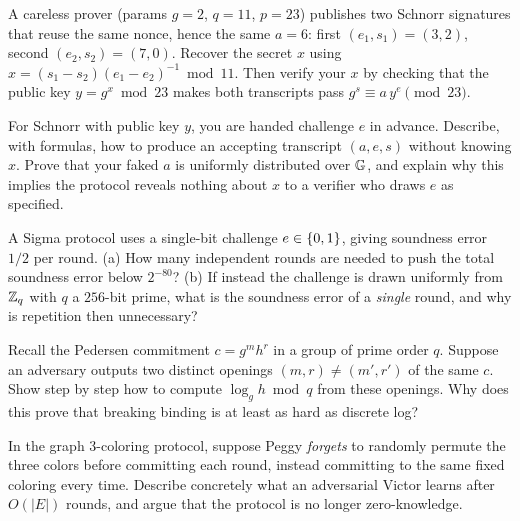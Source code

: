 \begin{exercise}
A careless prover (params $g=2$, $q=11$, $p=23$) publishes two Schnorr
signatures that reuse the same nonce, hence the same $a = 6$: first
$(e_1, s_1) = (3, 2)$, second $(e_2, s_2) = (7, 0)$. Recover the secret $x$ using
$x = (s_1 - s_2)(e_1 - e_2)^{-1} \bmod 11$. Then verify your $x$ by checking that
the public key $y = g^{x} \bmod 23$ makes both transcripts pass
$g^{s} \equiv a\,y^{e} \pmod{23}$.
\end{exercise}

\begin{exercise}
For Schnorr with public key $y$, you are handed challenge $e$ in advance.
Describe, with formulas, how to produce an accepting transcript $(a,e,s)$ without
knowing $x$. Prove that your faked $a$ is uniformly distributed over $\mathbb{G}$, and
explain why this implies the protocol reveals nothing about $x$ to a
verifier who draws $e$ as specified.
\end{exercise}

\begin{exercise}
A Sigma protocol uses a single-bit challenge $e \in \{0,1\}$, giving soundness
error $1/2$ per round. (a) How many independent rounds are needed to push the
total soundness error below $2^{-80}$? (b) If instead the challenge is drawn
uniformly from $\mathbb{Z}_q$ with $q$ a $256$-bit prime, what is the soundness error of
a \emph{single} round, and why is repetition then unnecessary?
\end{exercise}

\begin{exercise}
Recall the Pedersen commitment $c = g^{m} h^{r}$ in a group of prime order $q$.
Suppose an adversary outputs two distinct openings $(m,r) \ne (m',r')$ of the
same $c$. Show step by step how to compute $\log_g h \bmod q$ from these
openings. Why does this prove that breaking binding is at least as hard as
discrete log?
\end{exercise}

\begin{exercise}
In the graph 3-coloring protocol, suppose Peggy \emph{forgets} to randomly
permute the three colors before committing each round, instead committing to the
same fixed coloring every time. Describe concretely what an adversarial Victor
learns after $O(|E|)$ rounds, and argue that the protocol is no longer
zero-knowledge.
\end{exercise}

